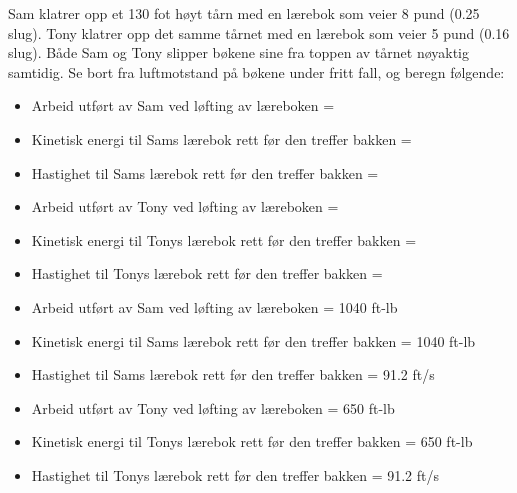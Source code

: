 
Sam klatrer opp et 130 fot høyt tårn med en lærebok som veier 8 pund (0.25 slug). Tony klatrer opp det samme tårnet med en lærebok som veier 5 pund (0.16 slug). Både Sam og Tony slipper bøkene sine fra toppen av tårnet nøyaktig samtidig. Se bort fra luftmotstand på bøkene under fritt fall, og beregn følgende:

\begin{itemize}
\item{} Arbeid utført av Sam ved løfting av læreboken =
\item{} Kinetisk energi til Sams lærebok rett før den treffer bakken =
\item{} Hastighet til Sams lærebok rett før den treffer bakken =
\end{itemize}

\begin{itemize}
\item{} Arbeid utført av Tony ved løfting av læreboken =
\item{} Kinetisk energi til Tonys lærebok rett før den treffer bakken =
\item{} Hastighet til Tonys lærebok rett før den treffer bakken =
\end{itemize}







\begin{itemize}
\item{} Arbeid utført av Sam ved løfting av læreboken = 1040 ft-lb
\item{} Kinetisk energi til Sams lærebok rett før den treffer bakken = 1040 ft-lb
\item{} Hastighet til Sams lærebok rett før den treffer bakken = 91.2 ft/s
\end{itemize}

\begin{itemize}
\item{} Arbeid utført av Tony ved løfting av læreboken = 650 ft-lb
\item{} Kinetisk energi til Tonys lærebok rett før den treffer bakken = 650 ft-lb
\item{} Hastighet til Tonys lærebok rett før den treffer bakken = 91.2 ft/s
\end{itemize}

